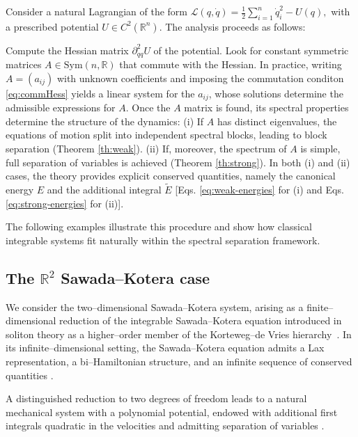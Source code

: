 \documentclass{rendiconti}
\begin{document}
Consider a natural Lagrangian of the form
$
\mathcal L(q,\dot q)=\tfrac12\sum_{i=1}^n \dot q_i^2-U(q),
$
with a prescribed potential $U\in C^2(\mathbb R^n)$. The analysis proceeds as follows:
%
\begin{outline}[itemize]
\1 Compute the Hessian matrix $\partial^2_{qq}U$ of the potential. 
\1 Look for constant symmetric
matrices $A\in\mathrm{Sym}(n,\mathbb R)$ that commute with the Hessian.
In practice, writing $A=(a_{ij})$ with unknown coefficients and imposing the
commutation conditon \eqref{eq:commHess}  yields a linear system for the $a_{ij}$,
whose solutions determine the admissible expressions for $A$.
\1 Once the $A$ matrix is found, its spectral properties determine the structure
of the dynamics:
(i) If $A$ has distinct eigenvalues, the equations of motion split
into independent spectral blocks, leading to block separation (Theorem \ref{th:weak}). 
(ii)  If, moreover,
the spectrum of $A$ is simple, full separation of variables is achieved (Theorem \ref{th:strong}). 
\1 In both (i) and (ii) cases, the theory provides explicit conserved quantities, namely the
canonical energy $E$ and the additional integral $\widetilde E$ [Eqs. \eqref{eq:weak-energies} for (i) and Eqs. \eqref{eq:strong-energies} for (ii)].
\end{outline}
%
The following examples illustrate this procedure and show how classical
integrable systems fit naturally within the spectral separation framework.


\subsection{The $\mathbb{R}^2$ Sawada--Kotera case}

We consider the two--dimensional Sawada--Kotera system, arising as a
finite--dimensional reduction of the integrable Sawada--Kotera equation
introduced in soliton theory as a higher--order member of the
Korteweg--de Vries hierarchy~\cite{SawadaKotera1974}. In its infinite--dimensional
setting, the Sawada--Kotera equation admits a Lax representation, a
bi--Hamiltonian structure, and an infinite sequence of conserved quantities \cite{FuchssteinerOevel1982}.

A distinguished reduction to two degrees of freedom leads to a natural
mechanical system with a polynomial potential, endowed with additional first
integrals quadratic in the velocities and admitting separation of variables \cite{Fordy1983,CosgroveScoufis1993}.
\end{document}
